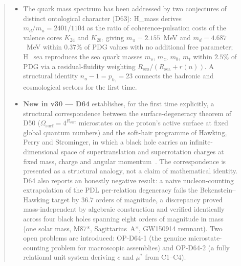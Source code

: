 \documentclass[11pt,a4paper]{article}
\theoremstyle{plain}
\theoremstyle{definition}
\theoremstyle{remark}
\newcommand{\Rsurf}{R_{\mathrm{surf}}}
\begin{document}
\begin{abstract}
\begin{itemize}
\item The quark mass spectrum has been addressed by two conjectures of distinct ontological character (D63): H\_mass derives $m_d/m_u = 2401/1104$ as the ratio of coherence-pulsation costs of the valence cores $K_{24}$ and $K_{28}$, giving $m_u = 2.155$~MeV and $m_d = 4.687$~MeV within $0.37\%$ of PDG values with no additional free parameter; H\_sea reproduces the sea quark masses $m_s$, $m_c$, $m_b$, $m_t$ within $2.5\%$ of PDG via a residual-fluidity weighting $R_{\mathrm{sea}}/(R_{\mathrm{sea}}+r(n))$. A structural identity $n_u - 1 = p_{k_1} = 23$ connects the hadronic and cosmological sectors for the first time.
\item \textbf{New in v30 --- D64} establishes, for the first time explicitly, a structural correspondence between the surface-degeneracy theorem of D50 ($\Omega_{\mathrm{surf}}=4^{\Rsurf}$ microstates on the proton's active surface at fixed global quantum numbers) and the soft-hair programme of Hawking, Perry and Strominger, in which a black hole carries an infinite-dimensional space of supertranslation and superrotation charges at fixed mass, charge and angular momentum~\cite{D64}. The correspondence is presented as a structural analogy, not a claim of mathematical identity. D64 also reports an honestly negative result: a naive nucleon-counting extrapolation of the PDL per-relation degeneracy fails the Bekenstein--Hawking target by $36.7$ orders of magnitude, a discrepancy proved mass-independent by algebraic construction and verified identically across four black holes spanning eight orders of magnitude in mass (one solar mass, M87*, Sagittarius~A*, GW150914 remnant). Two open problems are introduced: OP-D64-1 (the genuine microstate-counting problem for macroscopic assemblies) and OP-D64-2 (a fully relational unit system deriving $c$ and $\mu^*$ from C1--C4).

\end{itemize}
\end{abstract}
\end{document}
